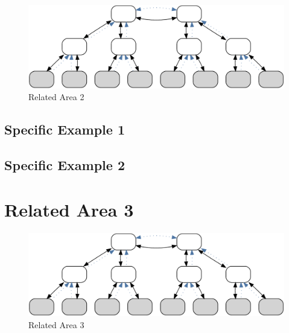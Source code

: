 \begin{figure}[!hbtp]
    \centering
    \includegraphics[width=1\textwidth]{resources/images/example3}
    \caption{Related Area 2}\label{fig:sota:ra2}
\end{figure}


\subsection{Specific Example 1}



\subsection{Specific Example 2}







\section{Related Area 3}



\begin{figure}[!hbtp]
    \centering
    \includegraphics[width=1\textwidth]{resources/images/example3}
    \caption{Related Area 3}\label{fig:sota:ra3}
\end{figure}

